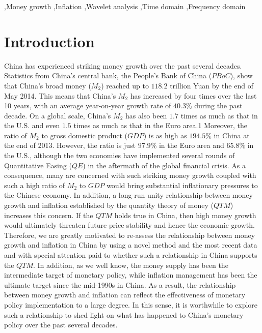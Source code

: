 \documentclass[a4paper,fleqn]{cas-sc}
\begin{document}
\begin{keywords}
    \sep Money growth
    \sep Inflation
    \sep Wavelet analysis
    \sep Time domain
    \sep Frequency domain 
\end{keywords}

\maketitle

\section{Introduction}
China has experienced striking money growth over the past several decades. Statistics from China's central bank, the People's Bank of China ($PBoC$), show that China's broad money ($M_2$) reached up to $118.2$ trillion Yuan by the end of May 2014. This means that China's $M_2$ has increased by four times over the last 10 years, with an average year-on-year growth rate of $40.3\%$ during the past decade. On a global scale, China's $M_2$ has also been $1.7$ times as much as that in the U.S. and even $1.5$ times as much as that in the Euro area.1 Moreover, the ratio of $M_2$ to gross domestic product ($GDP$) is as high as $194.5\%$ in China at the end of 2013. However, the ratio is just $97.9\%$ in the Euro area and $65.8\%$ in the U.S., although the two economies have implemented several rounds of Quantitative Easing ($QE$) in the aftermath of the global financial crisis. As a consequence, many are concerned with such striking money growth coupled with such a high ratio of $M_2$ to $GDP$ would bring substantial inflationary pressures to the Chinese economy. In addition, a long-run unity relationship between money growth and inflation established by the quantity theory of money ($QTM$) increases this concern. If the $QTM$ holds true in China, then high money growth would ultimately threaten future price stability and hence the economic growth. Therefore, we are greatly motivated to re-assess the relationship between money growth and inflation in China by using a novel method and the most recent data and with special attention paid to whether such a relationship in China supports the $QTM$. In addition, as we well know, the money supply has been the intermediate target of monetary policy, while inflation management has been the ultimate target since the mid-1990s in China. As a result, the relationship between money growth and inflation can reflect the effectiveness of monetary policy implementation to a large degree. In this sense, it is worthwhile to explore such a relationship to shed light on what has happened to China's monetary policy over the past several decades.
\end{document}
